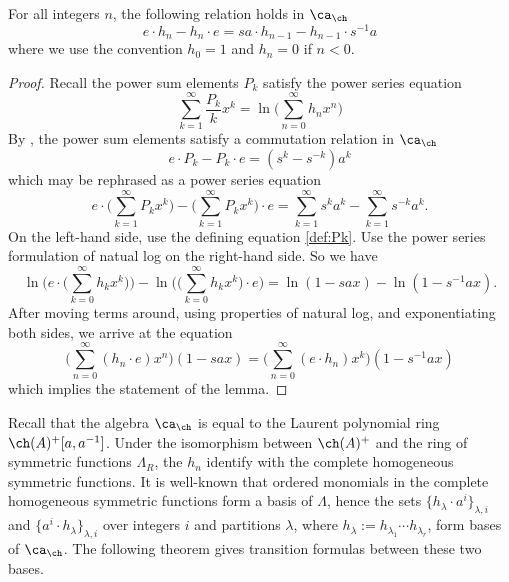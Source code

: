 \begin{lemma} \label{lem:homfly1}
For all integers $n$, the following relation holds in $\ca_\ch$
\begin{equation}
e \cdot h_n - h_n \cdot e = s a \cdot h_{n-1} - h_{n-1} \cdot  s^{-1} a
\end{equation}
where we use the convention $h_0 = 1$ and $h_n = 0$ if $n < 0$. 
\end{lemma}
\begin{proof}
Recall the power sum elements $P_k$ satisfy the power series equation
\begin{equation} \label{def:Pk}
\sum_{k=1}^\infty \frac{P_k}{k} x^k = \ln \Big( \sum_{n=0}^\infty h_n x^n \Big)
\end{equation}
By \cite[Theorem 4.2]{Mor02b}, the power sum elements satisfy a commutation relation in $\ca_\ch$
\begin{equation}
e \cdot P_k - P_k \cdot e = (s^{k} - s^{-k}) a^k
\end{equation} 
which may be rephrased as a power series equation 
\[
e \cdot \Big( \sum_{k=1}^\infty P_k x^k \Big) - \Big( \sum_{k=1}^\infty P_k x^k \Big) \cdot e = \sum_{k=1}^\infty s^k a^k - \sum_{k=1}^\infty s^{-k} a^k.
\]
On the left-hand side, use the defining equation \eqref{def:Pk}. Use the power series formulation of natual log on the right-hand side. So we have
\[
\ln \Bigg( e \cdot \Big( \sum_{k=0}^\infty h_k x^k \Big) \Bigg) - \ln \Bigg( \Big( \sum_{k=0}^\infty h_k x^k \Big) \cdot e \Bigg) = \ln ( 1 - s a x ) - \ln ( 1 - s^{-1} a x ).
\]
After moving terms around, using properties of natural log, and exponentiating both sides, we arrive at the equation
\[
\Big( \sum_{n=0}^\infty (h_n \cdot e ) x^n \Big) ( 1 - s a x ) = \Big( \sum_{n=0}^\infty ( e \cdot h_n ) x^k \Big) ( 1 - s^{-1} a x )
\]
which implies the statement of the lemma.
\end{proof}

Recall that the algebra $\ca_\ch$ is equal to the Laurent polynomial ring $\ch(A)^+[a, a^{-1}]$. Under the isomorphism between $\ch(A)^+$ and the ring of symmetric functions $\Lambda_R$, the $h_n$ identify with the complete homogeneous symmetric functions. It is well-known that ordered monomials in the complete homogeneous symmetric functions form a basis of $\Lambda$, hence the sets $\{h_\lambda \cdot a^i \}_{\lambda, i}$ and $\{a^i \cdot h_\lambda \}_{\lambda, i}$ over integers $i$ and partitions $\lambda$, where $h_\lambda := h_{\lambda_1} \cdots h_{\lambda_r}$, form bases of $\ca_\ch$. The following theorem gives transition formulas between these two bases. 

